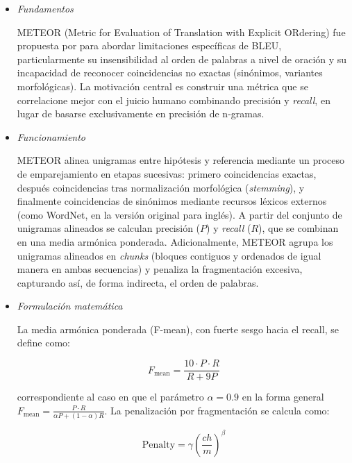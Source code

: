 \begin{itemize}
\item \textit{Fundamentos} \\
\vspace{-0.5cm}

METEOR (Metric for Evaluation of Translation with Explicit ORdering) fue propuesta por \citet{banerjee2005meteor} para abordar limitaciones específicas de BLEU, particularmente su insensibilidad al orden de palabras a nivel de oración y su incapacidad de reconocer coincidencias no exactas (sinónimos, variantes morfológicas). La motivación central es construir una métrica que se correlacione mejor con el juicio humano combinando precisión y \textit{recall}, en lugar de basarse exclusivamente en precisión de n-gramas.

\item \textit{Funcionamiento} \\
\vspace{-0.5cm}

METEOR alinea unigramas entre hipótesis y referencia mediante un proceso de emparejamiento en etapas sucesivas: primero coincidencias exactas, después coincidencias tras normalización morfológica (\textit{stemming}), y finalmente coincidencias de sinónimos mediante recursos léxicos externos (como WordNet, en la versión original para inglés). A partir del conjunto de unigramas alineados se calculan precisión ($P$) y \textit{recall} ($R$), que se combinan en una media armónica ponderada. Adicionalmente, METEOR agrupa los unigramas alineados en \textit{chunks} (bloques contiguos y ordenados de igual manera en ambas secuencias) y penaliza la fragmentación excesiva, capturando así, de forma indirecta, el orden de palabras.

\item \textit{Formulación matemática}\\
\vspace{-0.5cm}

La media armónica ponderada (F-mean), con fuerte sesgo hacia el recall, se define como:

\begin{equation}
F_{\text{mean}} = \frac{10 \cdot P \cdot R}{R + 9P}
\end{equation}

correspondiente al caso en que el parámetro $\alpha = 0.9$ en la forma general $F_{\text{mean}} = \frac{P \cdot R}{\alpha P + (1-\alpha) R}$. La penalización por fragmentación se calcula como:

\begin{equation}
\text{Penalty} = \gamma \left(\frac{ch}{m}\right)^{\beta}
\end{equation}


\end{itemize}
